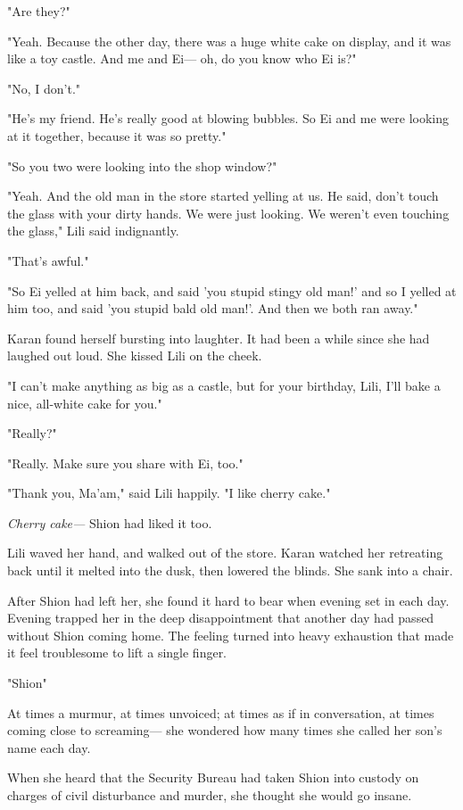 "Are they?"

"Yeah. Because the other day, there was a huge white cake on display,
and it was like a toy castle. And me and Ei--- oh, do you know who Ei is?"

"No, I don't."

"He's my friend. He's really good at blowing bubbles. So Ei and me were
looking at it together, because it was so pretty."

"So you two were looking into the shop window?"

"Yeah. And the old man in the store started yelling at us. He said,
don't touch the glass with your dirty hands. We were just looking. We
weren't even touching the glass," Lili said indignantly.

"That's awful."

"So Ei yelled at him back, and said 'you stupid stingy old man!' and so
I yelled at him too, and said 'you stupid bald old man!'. And then we
both ran away."

Karan found herself bursting into laughter. It had been a while since
she had laughed out loud. She kissed Lili on the cheek.

"I can't make anything as big as a castle, but for your birthday, Lili,
I'll bake a nice, all-white cake for you."

"Really?"

"Really. Make sure you share with Ei, too."

"Thank you, Ma'am," said Lili happily. "I like cherry cake."

\emph{Cherry cake---} Shion had liked it too.

Lili waved her hand, and walked out of the store. Karan watched her
retreating back until it melted into the dusk, then lowered the blinds.
She sank into a chair.

After Shion had left her, she found it hard to bear when evening set in
each day. Evening trapped her in the deep disappointment that another
day had passed without Shion coming home. The feeling turned into heavy
exhaustion that made it feel troublesome to lift a single finger.

"Shion\el "

At times a murmur, at times unvoiced; at times as if in conversation, at
times coming close to screaming--- she wondered how many times she called
her son's name each day.

When she heard that the Security Bureau had taken Shion into custody on
charges of civil disturbance and murder, she thought she would go
insane.

